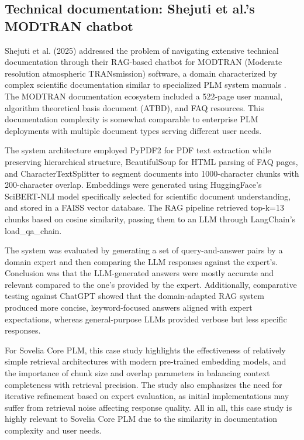 \subsection{Technical documentation: Shejuti et al.'s MODTRAN chatbot}

Shejuti et al. (2025) addressed the problem of navigating extensive technical documentation through their RAG-based chatbot for MODTRAN (Moderate resolution atmospheric TRANsmission) software, a domain characterized by complex scientific documentation similar to specialized PLM system manuals \parencite{shejuti_extended_2025}. The MODTRAN documentation ecosystem included a 522-page user manual, algorithm theoretical basis document (ATBD), and FAQ resources. This documentation complexity is somewhat comparable to enterprise PLM deployments with multiple document types serving different user needs.

The system architecture employed PyPDF2 for PDF text extraction while preserving hierarchical structure, BeautifulSoup for HTML parsing of FAQ pages, and CharacterTextSplitter to segment documents into 1000-character chunks with 200-character overlap. Embeddings were generated using HuggingFace's SciBERT-NLI model specifically selected for scientific document understanding, and stored in a FAISS vector database. The RAG pipeline retrieved top-k=13 chunks based on cosine similarity, passing them to an LLM through LangChain's load\_qa\_chain.

The system was evaluated by generating a set of query-and-answer pairs by a domain expert and then comparing the LLM responses against the expert's. Conclusion was that the LLM-generated answers were mostly accurate and relevant compared to the one's provided by the expert. Additionally, comparative testing against ChatGPT showed that the domain-adapted RAG system produced more concise, keyword-focused answers aligned with expert expectations, whereas general-purpose LLMs provided verbose but less specific responses.

For Sovelia Core PLM, this case study highlights the effectiveness of relatively simple retrieval architectures with modern pre-trained embedding models, and the importance of chunk size and overlap parameters in balancing context completeness with retrieval precision. The study also emphasizes the need for iterative refinement based on expert evaluation, as initial implementations may suffer from retrieval noise affecting response quality. All in all, this case study is highly relevant to Sovelia Core PLM due to the similarity in documentation complexity and user needs.

